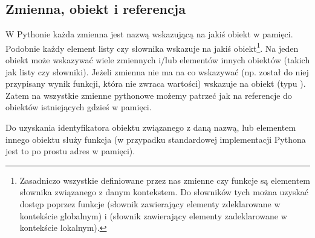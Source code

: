 % 
% 
% 
% 

\subsection{Zmienna, obiekt i referencja \zaawansowane{**}}

W Pythonie każda zmienna jest nazwą wskazującą na jakiś obiekt w pamięci. Podobnie każdy element listy czy słownika wskazuje na jakiś obiekt\footnote{
Zasadniczo wszystkie definiowane przez nas zmienne czy funkcje są elementem słownika związanego z danym kontekstem.
Do słowników tych można uzyskać dostęp poprzez funkcje  (słownik zawierający elementy zdeklarowane w kontekście globalnym) i
 (słownik zawierający elementy zadeklarowane w kontekście lokalnym).
}.
Na jeden obiekt może wskazywać wiele zmiennych i/lub elementów innych obiektów (takich jak listy czy słowniki).
Jeżeli zmienna nie ma na co wskazywać (np. został do niej przypisany wynik funkcji, która nie zwraca wartości) wskazuje na obiekt  (typu ).
Zatem na wszystkie zmienne pythonowe możemy patrzeć jak na referencje do obiektów istniejących gdzieś w pamięci.

Do uzyskania identyfikatora obiektu związanego z daną nazwą, lub elementem innego obiektu służy funkcja  (w przypadku standardowej implementacji Pythona jest to po prostu adres w pamięci).

